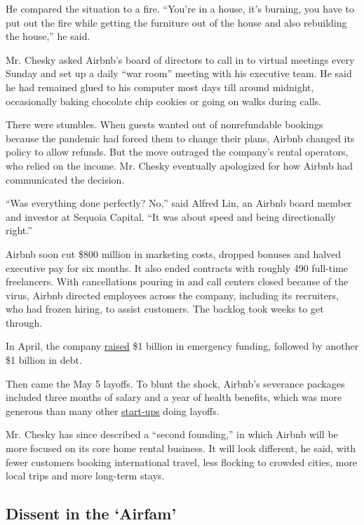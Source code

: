 He compared the situation to a fire. ``You're in a house, it's burning,
you have to put out the fire while getting the furniture out of the
house and also rebuilding the house,'' he said.

Mr. Chesky asked Airbnb's board of directors to call in to virtual
meetings every Sunday and set up a daily ``war room'' meeting with his
executive team. He said he had remained glued to his computer most days
till around midnight, occasionally baking chocolate chip cookies or
going on walks during calls.

There were stumbles. When guests wanted out of nonrefundable bookings
because the pandemic had forced them to change their plans, Airbnb
changed its policy to allow refunds. But the move outraged the company's
rental operators, who relied on the income. Mr. Chesky eventually
apologized for how Airbnb had communicated the decision.

``Was everything done perfectly? No,'' said Alfred Lin, an Airbnb board
member and investor at Sequoia Capital. ``It was about speed and being
directionally right.''

Airbnb soon cut \$800 million in marketing costs, dropped bonuses and
halved executive pay for six months. It also ended contracts with
roughly 490 full-time freelancers. With cancellations pouring in and
call centers closed because of the virus, Airbnb directed employees
across the company, including its recruiters, who had frozen hiring, to
assist customers. The backlog took weeks to get through.

In April, the company
\href{https://www.nytimes3xbfgragh.onion/2020/04/06/technology/airbnb-coronavirus-valuation.html}{raised}
\$1 billion in emergency funding, followed by another \$1 billion in
debt.

Then came the May 5 layoffs. To blunt the shock, Airbnb's severance
packages included three months of salary and a year of health benefits,
which was more generous than many other
\href{https://www.nytimes3xbfgragh.onion/2020/04/01/technology/virus-start-ups-pummeled-layoffs-unwinding.html}{start-ups}
doing layoffs.

Mr. Chesky has since described a ``second founding,'' in which Airbnb
will be more focused on its core home rental business. It will look
different, he said, with fewer customers booking international travel,
less flocking to crowded cities, more local trips and more long-term
stays.

\hypertarget{dissent-in-the-airfam}{%
\subsection{Dissent in the `Airfam'}\label{dissent-in-the-airfam}}


